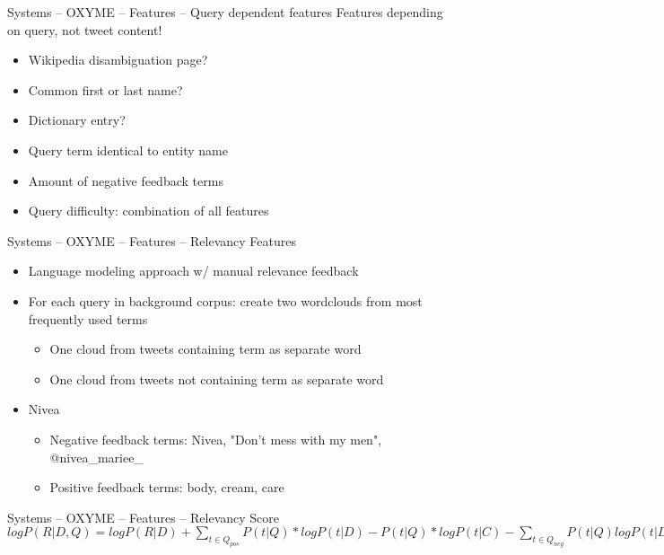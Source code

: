 \documentclass[12pt,a4paper]{beamer}
\begin{document}
\begin{frame}{Systems -- OXYME -- Features -- Query dependent features}
Features depending on query, not tweet content!
\begin{itemize}
\item Wikipedia disambiguation page?
\item Common first or last name?
\item Dictionary entry?
\item Query term identical to entity name
\item Amount of negative feedback terms
\item Query difficulty: combination of all features
\end{itemize}

\end{frame}


\begin{frame}{Systems -- OXYME -- Features -- Relevancy Features}
\begin{itemize}
\item Language modeling approach w/ manual relevance feedback
\item For each query in background corpus: create two wordclouds from most frequently used terms
  \begin{itemize}
  \item One cloud from tweets containing term as separate word
  \item One cloud from tweets not containing term as separate word
  \end{itemize}
\item Nivea
  \begin{itemize}
  \item Negative feedback terms: Nivea, "Don't mess with my men", @nivea\_mariee\_
  \item Positive feedback terms: body, cream, care
  \end{itemize}
\end{itemize}

\end{frame}


\begin{frame}{Systems -- OXYME -- Features -- Relevancy Score}
\begin{math} logP(R|D,Q) = logP(R|D) + \sum_{ t \in Q_{pos} } {P(t|Q)*logP(t|D) - P(t|Q)*logP(t|C)} - 
    \sum_{ t \in Q_{neg} } { P(t|Q)logP(t|D) - P(t|Q)logP(t|C) }
\end{math}

\end{frame}
\end{document}
